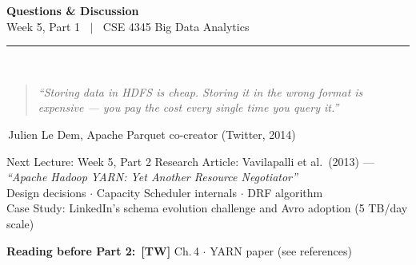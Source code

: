 \documentclass[aspectratio=169,10pt]{beamer}
\begin{document}
\begin{frame}[c]
  \begin{center}
    {\Large\bfseries Questions \& Discussion}\\[10pt]
    {\large Week 5, Part 1 $\;\mid\;$ CSE 4345 Big Data Analytics}\\[8pt]
    \textcolor{PUGray}{\rule{7cm}{0.5pt}}\\[10pt]
    \begin{quote}
      \itshape ``Storing data in HDFS is cheap.  Storing it in the \emph{wrong format} is expensive — you pay the cost every single time you query it.''
    \end{quote}
    \hfill\textemdash\,Julien Le Dem, Apache Parquet co-creator (Twitter, 2014)
    \vspace{12pt}
    \begin{block}{\centering Next Lecture: Week 5, Part 2}
      \centering
      Research Article: Vavilapalli et al.\ (2013) --- \textit{``Apache Hadoop YARN: Yet Another Resource Negotiator''}\\[4pt]
      \small Design decisions $\cdot$ Capacity Scheduler internals $\cdot$ DRF algorithm\\
      Case Study: LinkedIn's schema evolution challenge and Avro adoption (5 TB/day scale)
    \end{block}
    \vspace{6pt}
    \textbf{Reading before Part 2:}\ \textbf{[TW]} Ch.\,4 $\cdot$ YARN paper (see references)
  \end{center}
\end{frame}

\end{document}
